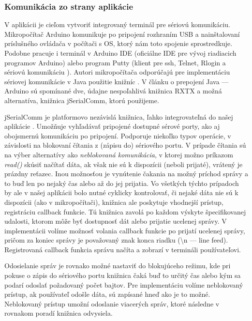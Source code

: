 \subsubsection{Komunikácia zo strany aplikácie}
V aplikácii je cieľom vytvoriť integrovaný terminál pre sériovú komunikáciu. Mikropočítač Arduino komunikuje po pripojení rozhraním USB a nainštalovaní príslušného ovládača v počítači s OS, ktorý nám toto spojenie sprostredkuje. Podobne pracuje i terminál v Arduino IDE (oficiálne IDE pre vývoj riadiacich programov Arduino) alebo program Putty (klient pre ssh, Telnet, Rlogin a sériovú komunikáciu \cite{putty}). Autori mikropočítača odporúčajú pre implementáciu sériovej komunikácie v Java použitie knižníc \cite{arduinoAndJava}. V článku o prepojení Java --- Arduino sú spomínané dve, údajne nespoľahlivá knižnica RXTX a možná alternatíva, knižnica jSerialComm, ktorú použijeme. 

jSerialComm je platformovo nezávislá knižnica, ľahko integrovateľná do našej aplikácie \cite{jSerialComm}. Umožňuje vyhľadávať pripojené dostupné sérové porty, ako aj obojsmernú komunikáciu po pripojení. Podporuje niekoľko typov operácie, v závislosti na blokovaní čítania z (zápisu do) sériového portu. V prípade čítania sú na výber alternatívy ako \textit{neblokovaná komunikácia}, v ktorej možno príkazom \textit{read()} skúsiť načítať dáta, ak však nie sú k dispozícii (neboli prijaté), vrátený je prázdny reťazec. Inou možnosťou je vynútenie čakania na možný príchod správy a to buď len po nejaký čas alebo až do jej prijatia. Vo všetkých týchto prípadoch by ale v našej aplikácii bolo nutné cyklicky kontrolovať, či nejaké dáta nie sú k dispozícii (ako v mikropočítači), knižnica ale poskytuje vhodnejší prístup, registráciu callback funkcie. Tú knižnica zavolá po každom výskyte špecifikovanej udalosti, ktorom môže byť dostupnosť dát alebo prijatie ucelenej správy. V implementácii volíme možnosť volania callback funkcie po prijatí ucelenej správy, pričom za koniec správy je považovaný znak konca riadku (\textbackslash n --- line feed). Registrovaná callback funkcia správu načíta a zobrazí v termináli používateľovi.

Odosielanie správ je rovnako možné nastaviť do blokujúceho režimu, kde pri pokuse o zápis do sériového portu knižnica čaká buď to určitý čas alebo kým sa podarí odoslať požadovaný počet bajtov. Pre implementáciu volíme neblokovaný prístup, ak používateľ odošle dáta, sú zapísané hneď ako je to možné. Neblokovaný prístup umožní odoslanie viacerých správ, ktoré následne v rovnakom poradí knižnica odvysiela.


